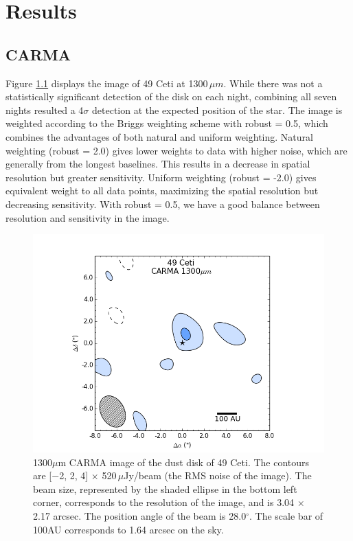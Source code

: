 \chapter{Results}
\label{chap3}

\section{CARMA}
\label{CARMAResults}
Figure \ref{fig:CARMA_image} displays the image of 49 Ceti at 1300\,$\mu m$. While there was not a statistically significant detection of the disk on each night, combining all seven nights resulted a 4$\sigma$ detection at the expected position of the star. The image is weighted according to the Briggs weighting scheme with robust = 0.5, which combines the advantages of both natural and uniform weighting. Natural weighting (robust = 2.0) gives lower weights to data with higher noise, which are generally from the longest baselines. This results in a decrease in spatial resolution but greater sensitivity. Uniform weighting (robust = -2.0) gives equivalent weight to all data points, maximizing the spatial resolution but decreasing sensitivity. With robust = 0.5, we have a good balance between resolution and sensitivity in the image. 

\begin{figure}[ht]
\centering
\includegraphics[width = 1\textwidth]{49CET_CARMA_16x16_1300um.png}
\caption{1300$\mu$m CARMA image of the dust disk of 49 Ceti. The contours are [$-$2, 2, 4] $\times$ 520\,$\mu$Jy/beam (the RMS noise of the image). The beam size, represented by the shaded ellipse in the bottom left corner, corresponds to the resolution of the image, and is 3.04 $\times$ 2.17 arcsec. The position angle of the beam is 28.0$^{\circ}$. The scale bar of 100AU corresponds to 1.64 arcsec on the sky.} 
\label{fig:CARMA_image}
\end{figure}

